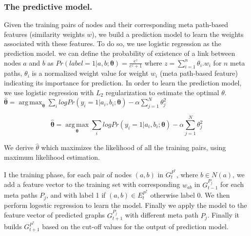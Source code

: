 




\subsubsection{The predictive model.} Given the training pairs of nodes and their corresponding meta path-based features (similarity weights $w$), we build a prediction model to learn the weights associated with these features. To do so, we use logistic regression as the prediction model. we can define the probability of existence of a link between nodes $a$ and $b$ as 
$
Pr(label = 1|a, b; \boldsymbol{\theta}) = \frac{e^{z}}{e^{z}+1}
$
where $z=\sum\limits_{i=1}^{n}\theta_i.w_i$ for $n$ meta paths, $\theta_i$ is a normalized weight value for weight $w_i$ (meta path-based feature) indicating its importance for prediction. In order to learn the prediction model, we use
logistic regression with $L_2$ regularization to estimate the optimal $\theta$. 
$\boldsymbol{\hat{\theta}} = 
\operatorname*{arg\,max}_{\boldsymbol{\theta}}\sum_i log Pr(y_i = 1|a_i, b_i; \boldsymbol{\theta}) - \alpha \sum_{j=1}^N \theta_j^2
$

\begin{equation*}
\boldsymbol{\hat{\theta}} = 
\operatorname*{arg\,max}_{\boldsymbol{\theta}}\sum_i log Pr(y_i = 1|a_i, b_i; \boldsymbol{\theta}) - \alpha \sum_{j=1}^N \theta_j^2
\end{equation*}

We derive \textbf{$\hat{\theta}$} which maximizes the likelihood of all the training pairs, using maximum likelihood estimation.


I the training phase, for each pair of nodes $(a,b)$ in $G^{P^*}_{t}$, where $b \in N(a)$, we add a feature vector to the training set with corresponding $w_{ab}$ in $G^{P_j}_{t-1}$ for each meta paths $P_j$, and with label 1 if $(a,b) \in E^{P^*}_{t}$ otherwise label 0. We then perform logestic regression to learn the model. Finally we apply the model to the feature vector of predicted graphs $G^{P_j}_{t+1}$ with different meta path $P_j$. Finally it builds $G^{P^*}_{t+1}$ based on the cut-off values for the output of prediction model.


